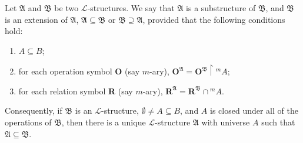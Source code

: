 Let $\mathfrak{A}$ and $\mathfrak{B}$ be two $\mathcal{L}$-structures. We say that $\mathfrak{A}$ is a substructure of $\mathfrak{B}$, and $\mathfrak{B}$ is an extension of $\mathfrak{A}$, $\mathfrak{A} \subseteq \mathfrak{B}$ or $\mathfrak{B} \supseteq \mathfrak{A}$, provided that the following conditions hold:
\begin{enumerate}
\item[(i)] $A \subseteq B$;
\item[(ii)] for each operation symbol $\mathbf{O}$ (say $m$-ary), $\mathbf{O}^{\mathfrak{A}} = \mathbf{O}^{\mathfrak{B}} \upharpoonright {}^m A$;
\item[(iii)] for each relation symbol $\mathbf{R}$ (say $m$-ary), $\mathbf{R}^{\mathfrak{A}} = \mathbf{R}^{\mathfrak{B}} \cap {}^m A$.
\end{enumerate}

Consequently, if $\mathfrak{B}$ is an $\mathcal{L}$-structure, $\emptyset \neq A \subseteq B$, and $A$ is closed under all of the operations of $\mathfrak{B}$, then there is a unique $\mathcal{L}$-structure $\mathfrak{A}$ with universe $A$ such that $\mathfrak{A} \subseteq \mathfrak{B}$.
